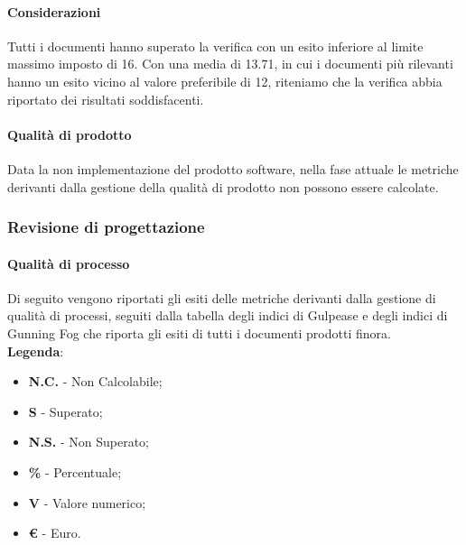	\paragraph*{Considerazioni} 
	Tutti i documenti hanno superato la verifica con un esito inferiore al limite massimo imposto di 16. 
	Con una media di 13.71, in cui i documenti più rilevanti hanno un esito vicino al valore preferibile di 12, riteniamo che la verifica abbia riportato dei risultati soddisfacenti. 
	
	\paragraph{Qualità di prodotto}
	Data la non implementazione del prodotto software, nella fase attuale le metriche derivanti dalla gestione della qualità di prodotto non possono essere calcolate.
\newpage
	\subsubsection{Revisione di progettazione}
	\paragraph{Qualità di processo}

Di seguito vengono riportati gli esiti delle metriche derivanti dalla gestione di qualità di processi, seguiti dalla tabella degli indici di Gulpease e degli indici di Gunning Fog che riporta gli esiti di tutti i documenti prodotti finora. \\
\textbf{Legenda}:
\begin{itemize}
	\item \textbf{N.C.} - Non Calcolabile;
	\item \textbf{S} - Superato;
	\item \textbf{N.S.} - Non Superato;
	\item \textbf{\%} - Percentuale;
	\item \textbf{V} - Valore numerico;
	\item \textbf{\euro{}} - Euro.
\end{itemize}

